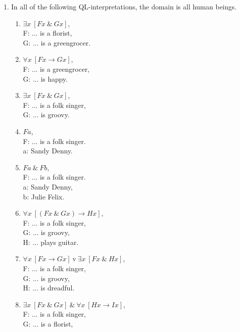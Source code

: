 \documentclass[a4paper,12pt]{article}
\newcommand{\ra}{\rightarrow}
\newcommand{\tv}{ \ \textrm{v} \ }
\newcommand{\ta}{ \ \& \ }
\newcommand{\all}{\forall}
\newcommand{\ex}{\exists}
\begin{document}
    \begin{enumerate}[label=\arabic*,leftmargin=*]
        \item In all of the following QL-interpretations, the domain is all human beings.
            \begin{enumerate}[label=(\roman*),leftmargin=*]
                \item $\ex x \ [Fx \ta Gx]$,\\
                    F: ... is a florist,\\
                    G: ... is a greengrocer.
                \item $\all x \ [Fx \ra Gx]$,\\
                    F: ... is a greengrocer,\\
                    G: ... is happy.
                \item $\ex x \ [Fx \ta Gx]$,\\
                    F: ... is a folk singer,\\
                    G: ... is groovy.
                \item $Fa$,\\
                    F: ... is a folk singer.\\
                    a: Sandy Denny.
                \item $Fa \ta Fb$,\\
                    F: ... is a folk singer.\\
                    a: Sandy Denny,\\
                    b: Julie Felix.
                \item $\all x \ [(Fx \ta Gx) \ra Hx]$,\\
                    F: ... is a folk singer,\\
                    G: ... is groovy,\\
                    H: ... plays guitar.
                \item $\all x \ [Fx \ra Gx] \tv \ex x \ [Fx \ta Hx]$,\\
                    F: ... is a folk singer,\\
                    G: ... is groovy,\\
                    H: ... is dreadful.
                \item $\ex x \ [Fx \ta Gx] \ta \all x \ [Hx \ra Ix]$,\\
                    F: ... is a folk singer,\\
                    G: ... is a florist,\\

\end{enumerate}
\end{enumerate}
\end{document}
